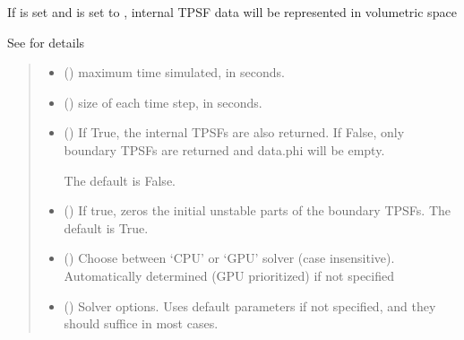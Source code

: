 \documentclass[letterpaper,10pt,english]{sphinxmanual}
\begin{document}
\begin{fulllineitems}
\begin{fulllineitems}
\sphinxAtStartPar
If  is set and  is set to , internal TPSF data will be represented in volumetric space

\sphinxAtStartPar
See {\hyperref[\detokenize{_autosummary/nirfasterff.forward.femdata.femdata_stnd_TR:nirfasterff.forward.femdata.femdata_stnd_TR}]{}} for details
\begin{quote}\begin{description}
\begin{itemize}
\item {} 
\sphinxAtStartPar
{} () \textendash{} maximum time simulated, in seconds.

\item {} 
\sphinxAtStartPar
{} () \textendash{} size of each time step, in seconds.

\item {} 
\sphinxAtStartPar
{} (\sphinxstyleliteralemphasis{\sphinxupquote{, }}) \textendash{} 
\sphinxAtStartPar
If True, the internal TPSFs are also returned. If False, only boundary TPSFs are returned and data.phi will be empty.

\sphinxAtStartPar
The default is False.


\item {} 
\sphinxAtStartPar
{} (\sphinxstyleliteralemphasis{\sphinxupquote{, }}) \textendash{} If true, zeros the initial unstable parts of the boundary TPSFs. The default is True.

\item {} 
\sphinxAtStartPar
{} (\sphinxstyleliteralemphasis{\sphinxupquote{, }}) \textendash{} Choose between ‘CPU’ or ‘GPU’ solver (case insensitive). Automatically determined (GPU prioritized) if not specified

\item {} 
\sphinxAtStartPar
{} ({\hyperref[\detokenize{_autosummary/nirfasterff.utils.SolverOptions:nirfasterff.utils.SolverOptions}]{}}\sphinxstyleliteralemphasis{\sphinxupquote{, }}) \textendash{} 
\sphinxAtStartPar
Solver options. Uses default parameters if not specified, and they should suffice in most cases.


\end{itemize}
\end{description}
\end{quote}
\end{fulllineitems}
\end{fulllineitems}
\end{document}

